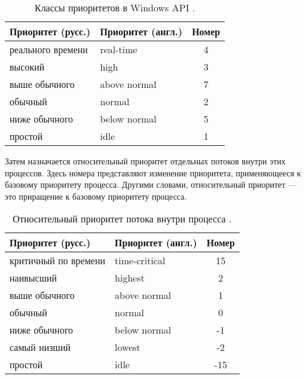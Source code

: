 \begin{table}[h]
	\begin{center}
		\captionsetup{justification=raggedright,singlelinecheck=off}
		\caption{\label{tbl:best3}Классы приоритетов в Windows API \cite{win6}.}
		\begin{tabular}{llc}
			\hline
			\textbf{Приоритет (русс.)} & \textbf{Приоритет (англ.)} & \textbf{Номер} \\
                \hline
			реального времени & real-time & 4 \\
                высокий & high & 3 \\
                выше обычного & above normal & 7 \\
                обычный & normal & 2 \\
                ниже обычного & below normal & 5 \\
                простой & idle & 1 \\
			\hline
		\end{tabular}
	\end{center}
\end{table}

Затем назначается относительный приоритет отдельных потоков внутри этих процессов. Здесь номера представляют изменение приоритета, применяющееся к базовому приоритету процесса. Другими словами,  относительный приоритет --- это приращение к базовому приоритету процесса.

\begin{table}[h]
	\begin{center}
	\captionsetup{justification=raggedright,singlelinecheck=off}
		\caption{\label{tbl:best3}Относительный приоритет потока внутри процесса \cite{win6}.}
		\begin{tabular}{llc}
			\hline
			\textbf{Приоритет (русс.)} & \textbf{Приоритет (англ.)} & \textbf{Номер} \\
                \hline
			критичный по времени & time-critical & 15 \\
                наивысший & highest & 2 \\
                выше обычного & above normal & 1 \\
                обычный & normal & 0 \\
                ниже обычного & below normal & -1 \\
                самый низший & lowest & -2 \\
                простой & idle & -15 \\
			\hline
		\end{tabular}
	\end{center}
\end{table}

